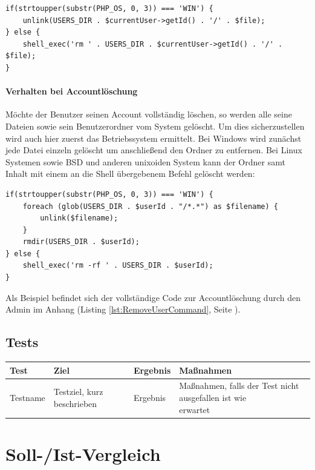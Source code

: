 \documentclass[10pt]{scrarticle}
\begin{document}
\lstset{firstnumber=53}
\begin{lstlisting}
if(strtoupper(substr(PHP_OS, 0, 3)) === 'WIN') {
    unlink(USERS_DIR . $currentUser->getId() . '/' . $file);
} else {
    shell_exec('rm ' . USERS_DIR . $currentUser->getId() . '/' . $file);
}
\end{lstlisting}

\paragraph{Verhalten bei Accountlöschung}
Möchte der Benutzer seinen Account vollständig löschen, so werden alle seine Dateien sowie sein Benutzerordner vom System gelöscht. Um dies sicherzustellen wird auch hier zuerst das Betriebssystem ermittelt. Bei Windows wird zunächst jede Datei einzeln gelöscht um anschließend den Ordner zu entfernen. Bei Linux Systemen sowie BSD und anderen unixoiden System kann der Ordner samt Inhalt mit einem an die Shell übergebenem Befehl gelöscht werden:

\lstset{firstnumber=31}
\begin{lstlisting}
if(strtoupper(substr(PHP_OS, 0, 3)) === 'WIN') {
    foreach (glob(USERS_DIR . $userId . "/*.*") as $filename) {
        unlink($filename);
    }
    rmdir(USERS_DIR . $userId);
} else {
    shell_exec('rm -rf ' . USERS_DIR . $userId);
}
\end{lstlisting}
Als Beispiel befindet sich der vollständige Code zur Accountlöschung durch den Admin im Anhang (Listing \ref{lst:RemoveUserCommand}, Seite \pageref{lst:RemoveUserCommand}).

\subsection{Tests}

\begin{table}[ht!]
\begin{tabularx}{\textwidth}{l | l | l | l}

\textbf{Test}  & \textbf{Ziel}  & \textbf{Ergebnis} & \textbf{Maßnahmen}\\
\hline
Testname  & Testziel, kurz beschrieben  & Ergebnis & \makecell[l]{Maßnahmen, falls der Test nicht ausgefallen ist wie \\ erwartet}\\

\end{tabularx}
\end{table}

\section{Soll-/Ist-Vergleich}
\end{document}
